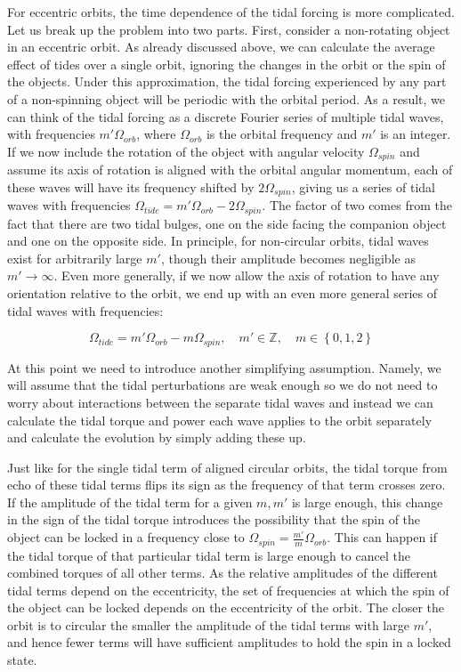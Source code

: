 For eccentric orbits, the time dependence of the tidal forcing is more
complicated. Let us break up the problem into two parts. First, consider a
non-rotating object in an eccentric orbit. As already discussed above, we can
calculate the average effect of tides over a single orbit, ignoring the changes
in the orbit or the spin of the objects. Under this approximation, the tidal
forcing experienced by any part of a non-spinning object will be periodic with
the orbital period. As a result, we can think of the tidal forcing as a discrete
Fourier series of multiple tidal waves, with frequencies $m' \Omega_{orb}$,
where $\Omega_{orb}$ is the orbital frequency and $m'$ is an integer. If we now
include the rotation of the object with angular velocity $\Omega_{spin}$ and
assume its axis of rotation is aligned with the orbital angular momentum, each
of these waves will have its frequency shifted by $2\Omega_{spin}$, giving us a
series of tidal waves with frequencies $\Omega_{tide} = m' \Omega_{orb} - 2
\Omega_{spin}$. The factor of two comes from the fact that there are two tidal
bulges, one on the side facing the companion object and one on the opposite
side. In principle, for non-circular orbits, tidal waves exist for arbitrarily
large $m'$, though their amplitude becomes negligible as $m'\rightarrow\infty$.
Even more generally, if we now allow the axis of rotation to have any
orientation relative to the orbit, we end up with an even more general series of
tidal waves with frequencies:

\begin{equation}
%
    \Omega_{tide} = m' \Omega_{orb} - m \Omega_{spin},
%
    \quad m' \in \mathbb{Z},\quad m \in \left\{0, 1, 2\right\}
%
\end{equation}

At this point we need to introduce another simplifying assumption. Namely, we
will assume that the tidal perturbations are weak enough so we do not need to
worry about interactions between the separate tidal waves and instead we can
calculate the tidal torque and power each wave applies to the orbit separately
and calculate the evolution by simply adding these up.

Just like for the single tidal term of aligned circular orbits, the tidal torque
from echo of these tidal terms flips its sign as the frequency of that term
crosses zero. If the amplitude of the tidal term for a given $m,m'$ is large
enough, this change in the sign of the tidal torque introduces the
possibility that the spin of the object can be locked in a frequency close to
$\Omega_{spin}=\frac{m'}{m} \Omega_{orb}$. This can happen if the tidal torque
of that particular tidal term is large enough to cancel the combined torques of
all other terms. As the relative amplitudes of the different tidal terms depend
on the eccentricity, the set of frequencies at which the spin of the object can
be locked depends on the eccentricity of the orbit. The closer the orbit is to
circular the smaller the amplitude of the tidal terms with large $m'$, and hence
fewer terms will have sufficient amplitudes to hold the spin in a locked state.

